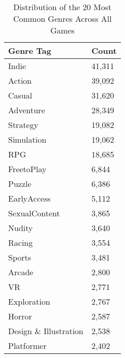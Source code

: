 \begin{table}[h]
    \centering
    \begin{tabular}{l|l}
    Genre Tag & Count\\\hline
        Indie & 41,311 \\
        Action & 39,092 \\
        Casual & 31,620 \\
        Adventure & 28,349 \\
        Strategy & 19,082 \\
        Simulation & 19,062 \\
        RPG & 18,685 \\
        FreetoPlay & 6,844 \\
        Puzzle & 6,386 \\
        EarlyAccess & 5,112 \\
        SexualContent & 3,865 \\
        Nudity & 3,640 \\
        Racing & 3,554 \\
        Sports & 3,481 \\
        Arcade & 2,800 \\
        VR & 2,771 \\
        Exploration & 2,767 \\
        Horror & 2,587 \\
        Design \& Illustration & 2,538 \\
        Platformer & 2,402
    \end{tabular}
    \caption{Distribution of the 20 Most Common Genres Across All Games}
    \label{tab:genre_metrics}
\end{table}